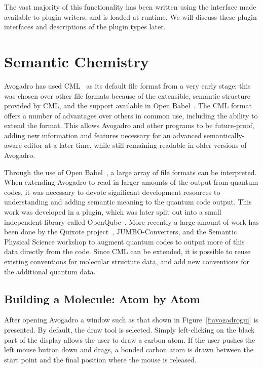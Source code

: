 \documentclass[10pt]{bmc_article}
\newenvironment{bmcformat}{\begin{raggedright}
\baselineskip20pt\sloppy\setboolean{publ}{false}}{\end{raggedright}
\baselineskip20pt\sloppy}
\begin{document}
\begin{bmcformat}
The vast majority of this functionality has been written using the
interface made available to plugin writers, and is loaded at
runtime. We will discuss these plugin interfaces and descriptions of
the plugin types later.

\section{Semantic Chemistry}

Avogadro has used CML~\cite{CML2011a, CML2011b} as its default file format from
a very early stage; this was chosen over other file formats because of the
extensible, semantic structure provided by CML, and the support available in
Open Babel~\cite{OpenBabel}. The CML format offers a number of advantages over
others in common use, including the ability to extend the format. This allows
Avogadro and other programs to be future-proof, adding new information and
features necessary for an advanced semantically-aware editor at a later time,
while still remaining readable in older versions of Avogadro.

Through the use of Open Babel~\cite{OpenBabel}, a large array of file formats
can be interpreted. When extending Avogadro to read in larger amounts of the
output from quantum codes, it was necessary to devote significant development
resources to understanding and adding semantic meaning to the quantum code
output. This work was developed in a plugin, which was later split out into a
small independent library called OpenQube~\cite{OpenQube,OpenQubeSource}. More
recently a large amount of work has been done by the Quixote
project~\cite{Quixote}, JUMBO-Converters, and the Semantic Physical Science
workshop to augment quantum codes to output more of this data directly from the
code. Since CML can be extended, it is possible to reuse existing conventions
for molecular structure data, and add new conventions for the additional quantum
data.

\subsection{Building a Molecule: Atom by Atom}

After opening Avogadro a window such as that shown in Figure~\ref{f:avogadrogui}
is presented. By default, the draw tool is selected. Simply left-clicking on the
black part of the display
allows the user to draw a carbon atom. If the user pushes the left
mouse button down and drags, a bonded carbon atom is drawn
between the start point and the final position where the mouse is released.


\end{bmcformat}
\end{document}
